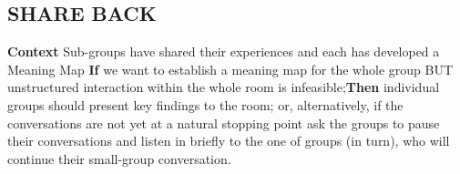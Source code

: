 \subsection*{SHARE BACK {\hfill\sensory}}

\textbf{Context} Sub-groups have shared their experiences and each has
developed a {\sc Meaning Map} \newline \textbf{If} we want to
establish a meaning map for the whole group BUT unstructured
interaction within the whole room is infeasible;\newline \textbf{Then}
individual groups should present key findings to the room; or,
alternatively, if the conversations are not yet at a natural stopping
point ask the groups to pause their conversations and listen in briefly
to the one of groups (in turn), who will continue their small-group
conversation.

